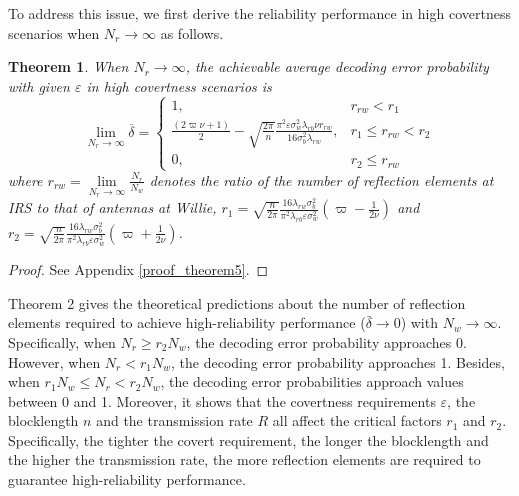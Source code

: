 \documentclass[conference]{IEEEtran}
\newtheorem{theorem}{Theorem}
\begin{document}
To address this issue, we first derive the reliability performance in high covertness scenarios when $N_r \to \infty$ as follows.

\begin{theorem}\label{theorem_Pe_asy}
	When $N_r \to \infty$, the achievable average decoding error probability with given $\varepsilon$ in high covertness scenarios is
	\begin{equation}\label{tradeoff}
		\mathop {\lim }\limits_{{N_r} \to \infty }\!\!\!\! \overline \delta \!=\!\! \begin{cases} 1 ,\!\!\! &\!\! r_{rw}<r_1 \\
			\!{\frac{{(2\varpi \nu  + 1)}}{2} \!-\! \sqrt {\frac{{2\pi }}{n}} \frac{{{\pi ^2}\varepsilon \sigma _w^2{\lambda _{rb}}\nu {r_{rw}}}}{{16\sigma _b^2{\lambda _{rw}}}}},\!\!\! &\!\! {{r_1} \!\leqslant\! {r_{rw}} \!\!<\! {r_2}}\\
			0,\!\!\! &\!\! r_2 \leqslant r_{rw} \end{cases}
	\end{equation}
	where ${r_{rw}} = \mathop {\lim }\limits_{{N_r} \to \infty } \frac{{{N_r}}}{{{N_w}}}$ denotes the ratio of the number of reflection elements at IRS to that of antennas at Willie, ${r_1} = \sqrt {\frac{n}{{2\pi }}} \frac{{16{\lambda _{rw}}\sigma _b^2}}{{{\pi ^2}{\lambda _{rb}}\varepsilon \sigma _w^2}}\left( {\varpi  - \frac{1}{{2\nu }}} \right)$ and ${r_2} = \sqrt {\frac{n}{{2\pi }}} \frac{{16{\lambda _{rw}}\sigma _b^2}}{{{\pi ^2}{\lambda _{rb}}\varepsilon \sigma _w^2}}\left( {\varpi  + \frac{1}{{2\nu }}} \right)$.
\end{theorem}
\begin{proof}
	See Appendix \ref{proof_theorem5}.
\end{proof}

Theorem 2 gives the theoretical predictions about the number of reflection elements required to achieve high-reliability performance ($\bar\delta \!\to\! 0$) with $N_w \!\to\! \infty$. Specifically, when ${N_r} \!\ge\! r_2 {N_w}$, the decoding error probability approaches 0. However, when ${N_r} \!<\! r_1{N_w}$, the decoding error probability approaches 1. Besides, when ${r_1}{N_w} \!\le\! {N_r} \!<\! {r_2}{N_w}$, the decoding error probabilities approach values between 0 and 1. Moreover, it shows that the covertness requirements $\varepsilon$, the blocklength $n$ and the transmission rate $R$ all affect the critical factors $r_1$ and $r_2$. Specifically, the tighter the covert requirement, the longer the blocklength and the higher the transmission rate, the more reflection elements are required to guarantee high-reliability performance.
\end{document}

